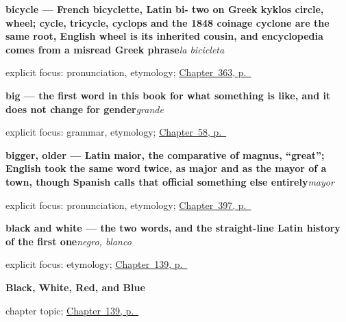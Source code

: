 \noindent\begin{minipage}[t]{\linewidth}
\raggedright
\textbf{bicycle — French bicyclette, Latin bi- two on Greek kyklos circle, wheel; cycle, tricycle, cyclops and the 1848 coinage cyclone are the same root, English wheel is its inherited cousin, and encyclopedia comes from a misread Greek phrase}\enspace\emph{la bicicleta}\par
\footnotesize explicit focus: pronunciation, etymology; \hyperref[ch:el-coche-y-el-avion]{Chapter~363, p.~\pageref*{ch:el-coche-y-el-avion}}
\end{minipage}\par\smallskip

\noindent\begin{minipage}[t]{\linewidth}
\raggedright
\textbf{big — the first word in this book for what something is like, and it does not change for gender}\enspace\emph{grande}\par
\footnotesize explicit focus: grammar, etymology; \hyperref[ch:grande]{Chapter~58, p.~\pageref*{ch:grande}}
\end{minipage}\par\smallskip

\noindent\begin{minipage}[t]{\linewidth}
\raggedright
\textbf{bigger, older — Latin maior, the comparative of magnus, \textquotedblleft{}great\textquotedblright{}; English took the same word twice, as major and as the mayor of a town, though Spanish calls that official something else entirely}\enspace\emph{mayor}\par
\footnotesize explicit focus: pronunciation, etymology; \hyperref[ch:barato-y-caro]{Chapter~397, p.~\pageref*{ch:barato-y-caro}}
\end{minipage}\par\smallskip

\noindent\begin{minipage}[t]{\linewidth}
\raggedright
\textbf{black and white — the two words, and the straight-line Latin history of the first one}\enspace\emph{negro, blanco}\par
\footnotesize explicit focus: etymology; \hyperref[ch:spanish-black-white-red-blue]{Chapter~139, p.~\pageref*{ch:spanish-black-white-red-blue}}
\end{minipage}\par\smallskip

\noindent\begin{minipage}[t]{\linewidth}
\raggedright
\textbf{Black, White, Red, and Blue}\par
\footnotesize chapter topic; \hyperref[ch:spanish-black-white-red-blue]{Chapter~139, p.~\pageref*{ch:spanish-black-white-red-blue}}
\end{minipage}\par\smallskip

